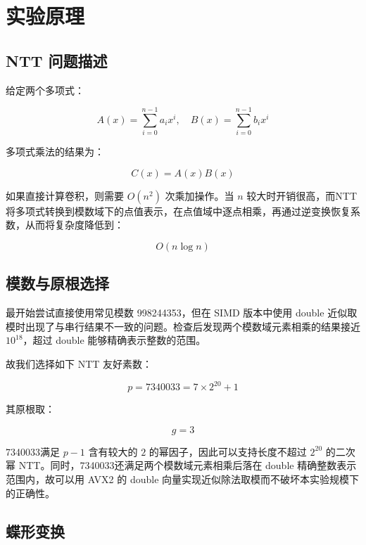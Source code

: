 \documentclass[a4paper,12pt]{ctexart}
\begin{document}
\section{实验原理}

\subsection{NTT 问题描述}

给定两个多项式：

\begin{equation}
A(x)=\sum_{i=0}^{n-1}a_i x^i,\quad B(x)=\sum_{i=0}^{n-1}b_i x^i
\end{equation}

多项式乘法的结果为：

\begin{equation}
C(x)=A(x)B(x)
\end{equation}

如果直接计算卷积，则需要 $O(n^2)$ 次乘加操作。当 $n$ 较大时开销很高，而NTT 将多项式转换到模数域下的点值表示，在点值域中逐点相乘，再通过逆变换恢复系数，从而将复杂度降低到：

\begin{equation}
O(n\log n)
\end{equation}

\subsection{模数与原根选择}
最开始尝试直接使用常见模数 998244353，但在 SIMD 版本中使用 double 近似取模时出现了与串行结果不一致的问题。检查后发现两个模数域元素相乘的结果接近 $10^{18}$，超过 double 能够精确表示整数的范围。

故我们选择如下 NTT 友好素数：

\begin{equation}
p=7340033=7\times 2^{20}+1
\end{equation}

其原根取：

\begin{equation}
g=3
\end{equation}

7340033满足 $p-1$ 含有较大的 $2$ 的幂因子，因此可以支持长度不超过 $2^{20}$ 的二次幂 NTT。同时，7340033还满足两个模数域元素相乘后落在 double 精确整数表示范围内，故可以用 AVX2 的 double 向量实现近似除法取模而不破坏本实验规模下的正确性。

\subsection{蝶形变换}
\end{document}

